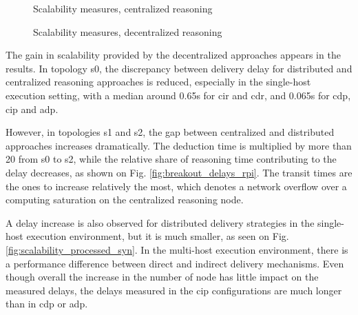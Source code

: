 \documentclass{iosart2c}
\begin{document}
\begin{figure}
	\caption{Scalability measures, centralized reasoning}
	\label{fig:factory_scala_processed}
	\Centering
	\label{fig:factory_scala_raw_rpi}
	\scalebox{1}{
		
	}
\end{figure}

\begin{figure}
	\caption{Scalability measures, decentralized reasoning}
	\vfill
	\noindent
	
	\begin{minipage}{0.33\textwidth}
		\Centering
		\label{fig:scalability_processed_rpi}
		\scalebox{0.9}{
			
		}
	\end{minipage}
	\begin{minipage}{0.33\textwidth}
		\Centering
		\label{fig:scalability_processed_rpi2}
		\scalebox{0.9}{
			
		}
	\end{minipage}
	\begin{minipage}{0.329\textwidth}
		\Centering
		\label{fig:factory_scala_cip_rpi2}
		\scalebox{0.9}{
			
		}
	\end{minipage}
\end{figure}

The gain in scalability provided by the decentralized approaches appears in the results. 
In topology s0, the discrepancy between delivery delay for distributed and centralized reasoning approaches is reduced, especially in the single-host execution setting, with a median around 0.65s for \gls{cir} and \gls{cdr}, and 0.065s for \gls{cdp}, \gls{cip} and \gls{adp}.

However, in topologies s1 and s2, the gap between centralized and distributed approaches increases dramatically. 
The deduction time is multiplied by more than 20 from s0 to s2, while the relative share of reasoning time contributing to the delay decreases, as shown on Fig. \ref{fig:breakout_delays_rpi}.
The transit times are the ones to increase relatively the most, which denotes a network overflow over a computing saturation on the centralized reasoning node.

A delay increase is also observed for distributed delivery strategies in the single-host execution environment, but it is much smaller, as seen on Fig. \ref{fig:scalability_processed_syn}.
In the multi-host execution environment, there is a performance difference between direct and indirect delivery mechanisms.
Even though overall the increase in the number of node has little impact on the measured delays, the delays measured in the \gls{cip} configurations are much longer than in \gls{cdp} or \gls{adp}. 
\end{document}
